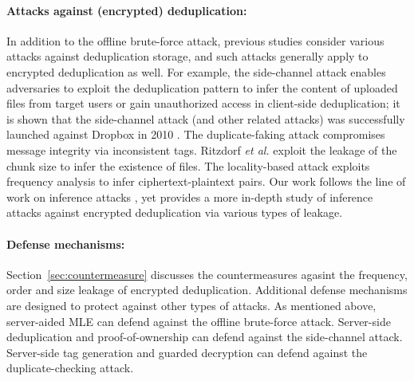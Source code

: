 \documentclass[bachelor]{thesis-uestc}
\begin{document}

\paragraph{Attacks against (encrypted) deduplication:} In addition to the
offline brute-force attack, previous studies consider various attacks against
deduplication storage, and such attacks generally apply to encrypted
deduplication as well.  For example, the side-channel attack
\cite{harnik10,halevi11} enables adversaries to exploit the deduplication
pattern to infer the content of uploaded files from target users or gain
unauthorized access in client-side deduplication; it is shown that the
side-channel attack (and other related attacks) was successfully launched
against Dropbox in 2010 \cite{mulazzani11}.  The duplicate-faking attack
\cite{bellare13a} compromises message integrity via inconsistent tags.
Ritzdorf {\em et al.} \cite{ritzdorf16} exploit the leakage of the chunk size
to infer the existence of files.  The locality-based attack \cite{li17}
exploits frequency analysis to infer ciphertext-plaintext pairs.  Our
work follows the line of work on inference attacks \cite{ritzdorf16,li17}, yet
provides a more in-depth study of inference attacks against encrypted
deduplication via various types of leakage. 
   
\paragraph{Defense mechanisms:} 
Section~\ref{sec:countermeasure} discusses the countermeasures agasint the frequency, order and size leakage of encrypted deduplication. 
Additional defense mechanisms are designed to protect against other types of attacks.  
As mentioned above,
server-aided MLE \cite{bellare13b} can defend against the offline brute-force
attack. Server-side deduplication \cite{li15,harnik10,armknecht17} and
proof-of-ownership \cite{xu13,pietro12,halevi11} can defend against the
side-channel attack.  Server-side tag generation \cite{douceur02,bellare13b}
and guarded decryption \cite{bellare13a} can defend against the
duplicate-checking attack.  
\end{document}
